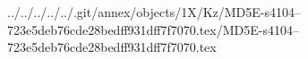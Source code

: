 ../../../../../.git/annex/objects/1X/Kz/MD5E-s4104--723e5deb76cde28bedff931dff7f7070.tex/MD5E-s4104--723e5deb76cde28bedff931dff7f7070.tex